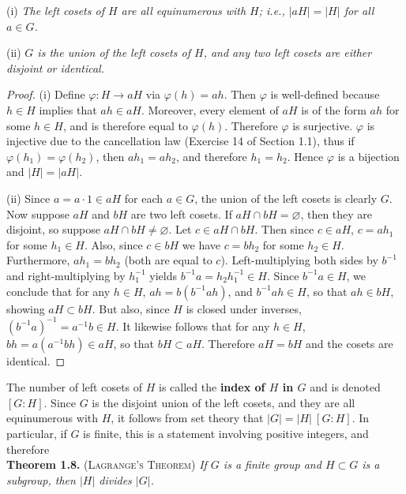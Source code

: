 \documentclass[leqno]{book}
\begin{document}
(i) \emph{The left cosets of $H$ are all equinumerous with $H$; i.e., $|aH|=|H|$ for all $a\in G$.}

(ii) \emph{$G$ is the union of the left cosets of $H$, and any two left cosets are either disjoint or identical.}

\begin{proof}
(i) Define $\varphi:H\to aH$ via $\varphi(h)=ah$.  Then $\varphi$ is well-defined because $h\in H$ implies that $ah\in aH$.  Moreover, every element of $aH$ is of the form $ah$ for some $h\in H$, and is therefore equal to $\varphi(h)$.  Therefore $\varphi$ is surjective.  $\varphi$ is injective due to the cancellation law (Exercise 14 of Section 1.1), thus if $\varphi(h_1)=\varphi(h_2)$, then $ah_1=ah_2$, and therefore $h_1=h_2$.  Hence $\varphi$ is a bijection and $|H|=|aH|$.

(ii) Since $a=a\cdot 1\in aH$ for each $a\in G$, the union of the left cosets is clearly $G$.  Now suppose $aH$ and $bH$ are two left cosets.  If $aH\cap bH=\varnothing$, then they are disjoint, so suppose $aH\cap bH\ne\varnothing$.  Let $c\in aH\cap bH$.  Then since $c\in aH$, $c=ah_1$ for some $h_1\in H$.  Also, since $c\in bH$ we have $c=bh_2$ for some $h_2\in H$.  Furthermore, $ah_1=bh_2$ (both are equal to $c$).  Left-multiplying both sides by $b^{-1}$ and right-multiplying by $h_1^{-1}$ yields $b^{-1}a=h_2h_1^{-1}\in H$.  Since $b^{-1}a\in H$, we conclude that for any $h\in H$, $ah=b(b^{-1}ah)$, and $b^{-1}ah\in H$, so that $ah\in bH$, showing $aH\subset bH$.  But also, since $H$ is closed under inverses, $(b^{-1}a)^{-1}=a^{-1}b\in H$.  It likewise follows that for any $h\in H$, $bh=a(a^{-1}bh)\in aH$, so that $bH\subset aH$.  Therefore $aH=bH$ and the cosets are identical.
\end{proof}

\noindent The number of left cosets of $H$ is called the \textbf{index of $H$ in $G$} and is denoted $[G:H]$.  Since $G$ is the disjoint union of the left cosets, and they are all equinumerous with $H$, it follows from set theory that $|G|=|H|~[G:H]$.  In particular, if $G$ is finite, this is a statement involving positive integers, and therefore\\ %

\noindent\textbf{Theorem 1.8.} (\textsc{Lagrange's Theorem}) \emph{If $G$ is a finite group and $H\subset G$ is a subgroup, then $|H|$ divides $|G|$.}\\
\end{document}
